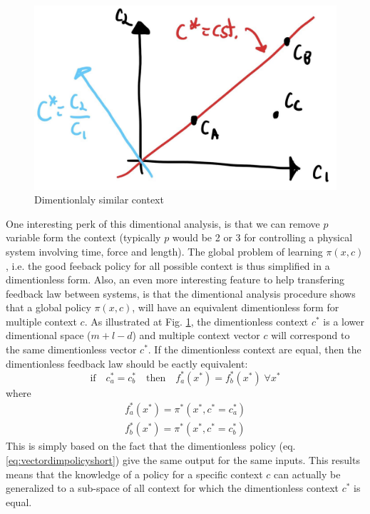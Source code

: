 \begin{figure}[ht]
\vspace{-5pt}
\begin{center}
\includegraphics[width=0.99\linewidth]{fig/c_space.jpg}
\caption{Dimentionlaly similar context}\label{fig:c_space}
\end{center}
\vspace{-15pt}
\end{figure}
One interesting perk of this dimentional analysis, is that we can remove $p$ variable form the context (typically $p$ would be 2 or 3 for controlling a physical system involving time, force and length). The global problem of learning $\pi(x,c)$, i.e. the good feeback policy for all possible context is thus simplified in a dimentionless form. Also, an even more interesting feature to help transfering feedback law between systems, is that the dimentional analysis procedure shows that a global policy $\pi( x , c )$, will have an equivalent dimentionless form for multiple context $c$. As illustrated at Fig. \ref{fig:c_space}, the dimentionless context $c^*$ is a lower dimentional space ($m+l-d$) and multiple context vector $c$ will correspond to the same dimentionless vector $c^*$. If the dimentionless context are equal, then the dimentionless feedback law should be eactly equivalent:
\begin{equation}
\text{if} \quad c_a^* = c_b^*  \quad \text{then} \quad f_a^*(x^*) = f_b^*(x^*) \; \forall x^*   
\end{equation}
where
\begin{align}
f_a^*(x^*) = \pi^*( x^* , c^* = c_a^*)\\
f_b^*(x^*) = \pi^*( x^* , c^* = c_b^*)
\end{align}
This is simply based on the fact that the dimentionless policy (eq. \eqref{eq:vectordimpolicyshort}) give the same output for the same inputs. This results means that the knowledge of a policy for a specific context $c$ can actually be generalized to a sub-space of all context for which the dimentionless context $c^*$ is equal.

